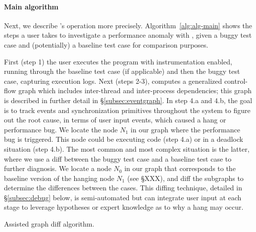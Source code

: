 \paragraph{Main algorithm} Next, we describe \xxx's operation more precisely.
Algorithm~\ref{alg:alg-main} shows the steps a user takes to investigate a
performance anomaly with \xxx, given a buggy test case and (potentially) a
baseline test case for comparison purposes.

First (step 1) the user executes the program with \xxx instrumentation enabled,
running through the baseline test case (if applicable) and then the buggy test
case, capturing execution logs. Next (steps 2-3), \xxx computes a generalized
control-flow graph which includes inter-thread and inter-process dependencies;
this graph is described in further detail in \S\ref{subsec:eventgraph}. In step
4.a and 4.b, the goal is to track events and synchronization primitives
throughout the system to figure out the root cause, in terms of user input
events, which caused a hang or performance bug. We locate the node $N_1$ in our
graph where the performance bug is triggered. This node could be executing code
(step 4.a) or in a deadlock situation (step 4.b). The most common and most
complex situation is the latter, where we use a diff between the buggy test
case and a baseline test case to further diagnosis. We locate a node $N_0$ in
our graph that corresponds to the baseline version of the hanging node $N_1$
(see \S XXX), and diff the subgraphs to determine the differences between the
cases. This diffing technique, detailed in \S\ref{subsec:debug} below, is
semi-automated but can integrate user input at each stage to leverage
hypotheses or expert knowledge as to why a hang may occur.


\begin{algorithm}[h!]
    \caption{\xxx Assisted graph diff algorithm.}
    \label{alg:alg-graphdiff}
\begin{algorithmic}[1]
\Statex
{}
	\EndIf
	\EndIf
\EndFor
{}
\EndFunction
\end{algorithmic}
\end{algorithm}

